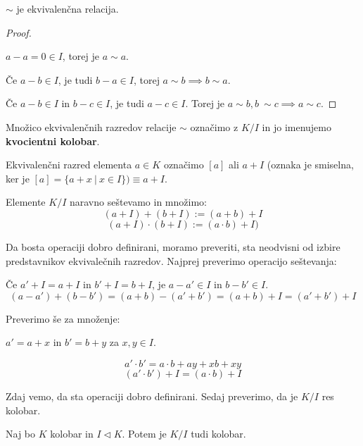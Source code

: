 \documentclass[11pt, a4paper]{article}
\begin{document}
    \begin{proposition}
        \(\sim\) je ekvivalenčna relacija.
    \end{proposition}

    \begin{proof}
        \(\)\par
        \(a - a = 0 \in I\), torej je \(a \sim a\).
        \par
        Če \(a - b \in I\), je tudi \(b - a \in I\), torej \(a \sim b \implies b \sim a\).
        \par
        Če \(a - b \in I\) in \(b - c \in I\), je tudi \(a - c \in I\). Torej je \(a \sim b, b\ \sim c \implies a \sim c\).
    \end{proof}

    \begin{definition}
        Množico ekvivalenčnih razredov relacije \(\sim\) označimo z \(K / I\) in jo imenujemo \textbf{kvocientni kolobar}. 
    \end{definition}

    Ekvivalenčni razred elementa \(a \in K\) označimo \([a]\) ali \(a + I\) (oznaka je smiselna, ker je \([a] = \{a + x\ |\ x \in I\}) \equiv a + I\).

    \par
    Elemente \(K / I\) naravno seštevamo in množimo:
    \[(a+I) + (b+I) := (a+b) + I\]
    \[(a+I) \cdot (b+I) := (a \cdot b) + I)\]

    Da bosta operaciji dobro definirani, moramo preveriti, sta neodvisni od izbire predstavnikov ekvivalečnih razredov. Najprej preverimo operacijo seštevanja:
    \par
    Če \(a' + I = a + I\) in \(b' + I = b + I\), je \(a - a' \in I\) in \(b - b' \in I\).
    \[(a - a') + (b - b') = (a + b) - (a' + b') = (a + b) + I = (a' + b') + I\]
    
    Preverimo še za množenje:
    \begin{center}
        \(a' = a + x\) in \(b' = b + y\) za \(x,y \in I\).
    \end{center}
    
    \[a' \cdot b' = a \cdot b + ay + xb + xy\]
    \[(a' \cdot b') + I = (a \cdot b) + I\]

    Zdaj vemo, da sta operaciji dobro definirani. Sedaj preverimo, da je \(K / I\) res kolobar.

    \begin{proposition}
        Naj bo \(K\) kolobar in \(I \triangleleft K\). Potem je \(K / I\) tudi kolobar.
    \end{proposition}
\end{document}

